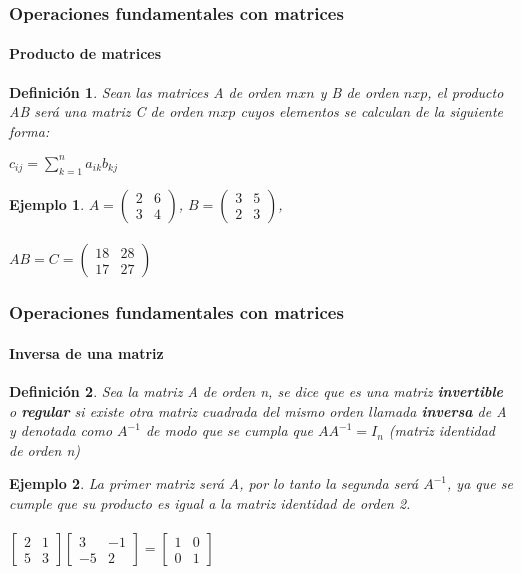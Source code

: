 \documentclass[11pt]{beamer}
\newtheorem{defi}{Definición}
\newtheorem{ejem}{Ejemplo}
\begin{document}
\begin{frame}
\frametitle{Operaciones fundamentales con matrices}
\framesubtitle{Producto de matrices}
\begin{defi}
Sean las matrices A de orden $mxn$ y B de orden $nxp$, el producto AB será una matriz C de orden $mxp$ cuyos elementos se calculan de la siguiente forma:\\
\begin{center}
$c_{ij} =
\sum_{k=1}^{n}a_{ik}b_{kj} $
\end{center}
\end{defi}
\begin{ejem}
${\displaystyle A={\begin{pmatrix}2&6\\3&4\end{pmatrix}}}$, 
${\displaystyle B={\begin{pmatrix}3&5\\2&3\end{pmatrix}}}$, \\ \hspace{0cm} \\
${\displaystyle AB=C={\begin{pmatrix}18&28\\17&27\end{pmatrix}}}$
\end{ejem}
\end{frame}

\begin{frame}
\frametitle{Operaciones fundamentales con matrices}
\framesubtitle{Inversa de una matriz}
\begin{defi}
Sea la matriz A de orden n, se dice que es una matriz \textbf{invertible} o \textbf{regular} si existe otra matriz cuadrada del mismo orden llamada \textbf{inversa} de A y denotada como $A^{-1}$ de modo que se cumpla que $AA^{-1} = I_n$ (matriz identidad de orden n)
\end{defi}
\begin{ejem}
La primer matriz será A, por lo tanto la segunda será $A^{-1}$, ya que se cumple que su producto es igual a la matriz identidad de orden 2.\\ \hspace{0cm} \\
${\displaystyle {\begin{bmatrix}2&1\\5&3\end{bmatrix}}{\begin{bmatrix}3&-1\\-5&2\end{bmatrix}}={\begin{bmatrix}1&0\\0&1\end{bmatrix}}}$
\end{ejem}
\end{frame}
\end{document}
